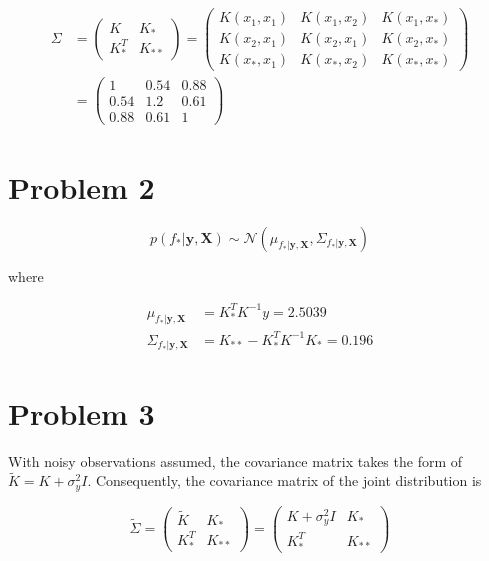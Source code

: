 \documentclass[12pt]{article}
\begin{document}
\begin{equation}
\begin{align}
 \Sigma &= \begin{pmatrix} K & K_* \\ K_*^T & K_{**} \end{pmatrix} = \begin{pmatrix} K(x_1, x_1) & K(x_1, x_2) & K(x_1, x_*) \\ K(x_2, x_1) & K(x_2, x_1) & K(x_2, x_*) \\ K(x_*, x_1) & K(x_*, x_2) & K(x_*, x_*) \end{pmatrix} \\
 &= \begin{pmatrix} 1 & 0.54 & 0.88 \\ 0.54 & 1.2 & 0.61 \\ 0.88 & 0.61 & 1 \end{pmatrix}
 \end{align}
\end{equation}

\section*{Problem 2}

\begin{equation}
 p(f_*| \mathbf{y}, \mathbf{X}) \sim \mathcal{N} \left(\mu_{f_*| \mathbf{y}, \mathbf{X}}, \Sigma_{f_*| \mathbf{y}, \mathbf{X}} \right)
\end{equation}

where

\begin{equation}
 \begin{align}
  \mu_{f_*| \mathbf{y}, \mathbf{X}} &= K_*^T K^{-1} y = 2.5039 \\
  \Sigma_{f_*| \mathbf{y}, \mathbf{X}} &= K_{**} - K_*^T K^{-1} K_* = 0.196
 \end{align}
\end{equation}

\section*{Problem 3}

With noisy observations assumed, the covariance matrix takes the form of $\widetilde{K} = K + \sigma_y^2I$. Consequently, the covariance matrix of the joint distribution is 

\begin{equation}
 \widetilde{\Sigma} = \begin{pmatrix} \widetilde{K} & K_* \\ K_*^T & K_{**} \end{pmatrix} = \begin{pmatrix} K + \sigma_y^2I & K_* \\ K_*^T & K_{**} \end{pmatrix}
\end{equation}
\end{document}
